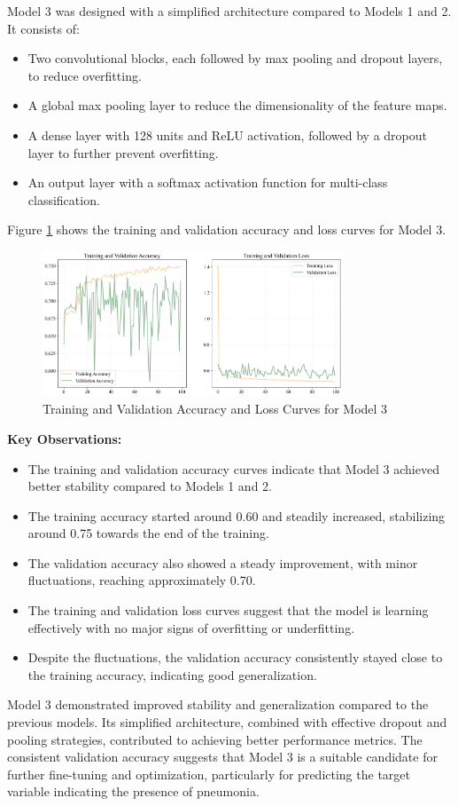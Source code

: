 Model 3 was designed with a simplified architecture compared to Models 1 and 2. It consists of:
\begin{itemize}
    \item Two convolutional blocks, each followed by max pooling and dropout layers, to reduce overfitting.
    \item A global max pooling layer to reduce the dimensionality of the feature maps.
    \item A dense layer with 128 units and ReLU activation, followed by a dropout layer to further prevent overfitting.
    \item An output layer with a softmax activation function for multi-class classification.
\end{itemize}
Figure \ref{fig:chap3 figure3} shows the training and validation accuracy and loss curves for Model 3.

\begin{figure}[H]
    \centering
    \includegraphics[width=0.8\textwidth]{figures/Figure31.png}
    \caption{Training and Validation Accuracy and Loss Curves for Model 3}
    \label{fig:chap3 figure3}
\end{figure}

\textbf{Key Observations:}
\begin{itemize}
    \item The training and validation accuracy curves indicate that Model 3 achieved better stability compared to Models 1 and 2.
    \item The training accuracy started around 0.60 and steadily increased, stabilizing around 0.75 towards the end of the training.
    \item The validation accuracy also showed a steady improvement, with minor fluctuations, reaching approximately 0.70.
    \item The training and validation loss curves suggest that the model is learning effectively with no major signs of overfitting or underfitting.
    \item Despite the fluctuations, the validation accuracy consistently stayed close to the training accuracy, indicating good generalization.
\end{itemize}

Model 3 demonstrated improved stability and generalization compared to the previous models. Its simplified architecture, combined with effective dropout and pooling strategies, contributed to achieving better performance metrics. The consistent validation accuracy suggests that Model 3 is a suitable candidate for further fine-tuning and optimization, particularly for predicting the target variable indicating the presence of pneumonia.